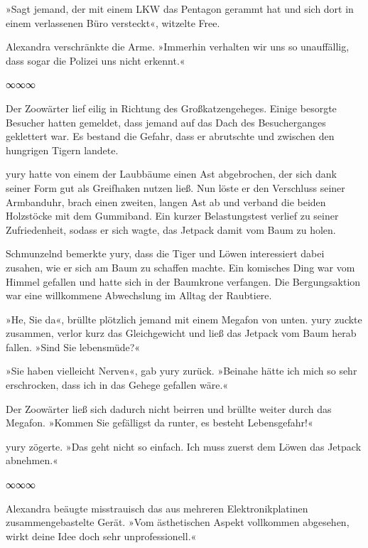 »Sagt jemand, der mit einem LKW das Pentagon gerammt hat und sich dort in einem verlassenen Büro versteckt«, witzelte Free.

Alexandra verschränkte die Arme. »Immerhin verhalten wir uns so unauffällig, dass sogar die Polizei uns nicht erkennt.«

\begin{center}
	∞∞∞
\end{center}

Der Zoowärter lief eilig in Richtung des Großkatzengeheges. Einige besorgte Besucher hatten gemeldet, dass jemand auf das Dach des Besucherganges geklettert war. Es bestand die Gefahr, dass er abrutschte und zwischen den hungrigen Tigern landete.

yury hatte von einem der Laubbäume einen Ast abgebrochen, der sich dank seiner Form gut als Greifhaken nutzen ließ. Nun löste er den Verschluss seiner Armbanduhr, brach einen zweiten, langen Ast ab und verband die beiden Holzstöcke mit dem Gummiband. Ein kurzer Belastungstest verlief zu seiner Zufriedenheit, sodass er sich wagte, das Jetpack damit vom Baum zu holen.

Schmunzelnd bemerkte yury, dass die Tiger und Löwen interessiert dabei zusahen, wie er sich am Baum zu schaffen machte. Ein komisches Ding war vom Himmel gefallen und hatte sich in der Baumkrone verfangen. Die Bergungsaktion war eine willkommene Abwechslung im Alltag der Raubtiere.

»He, Sie da«, brüllte plötzlich jemand mit einem Megafon von unten. yury zuckte zusammen, verlor kurz das Gleichgewicht und ließ das Jetpack vom Baum herab fallen. »Sind Sie lebensmüde?«

»Sie haben vielleicht Nerven«, gab yury zurück. »Beinahe hätte ich mich so sehr erschrocken, dass ich in das Gehege gefallen wäre.«

Der Zoowärter ließ sich dadurch nicht beirren und brüllte weiter durch das Megafon. »Kommen Sie gefälligst da runter, es besteht Lebensgefahr!«

yury zögerte. »Das geht nicht so einfach. Ich muss zuerst dem Löwen das Jetpack abnehmen.«

\begin{center}
	∞∞∞
\end{center}

Alexandra beäugte misstrauisch das aus mehreren Elektronikplatinen zusammengebastelte Gerät. »Vom ästhetischen Aspekt vollkommen abgesehen, wirkt deine Idee doch sehr unprofessionell.«

